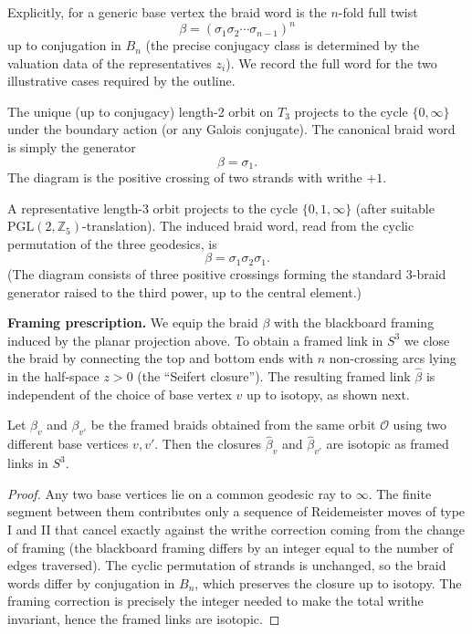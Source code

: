Explicitly, for a generic base vertex the braid word is the \(n\)-fold full twist
\[
\beta = (\sigma_1\sigma_2\cdots\sigma_{n-1})^n
\]
up to conjugation in \(B_n\) (the precise conjugacy class is determined by the valuation data of the representatives \(z_i\)). We record the full word for the two illustrative cases required by the outline.

\begin{example}[Case \(p=3\), \(n=2\)]
The unique (up to conjugacy) length-2 orbit on \(T_3\) projects to the cycle \(\{0,\infty\}\) under the boundary action (or any Galois conjugate). The canonical braid word is simply the generator
\[
\beta = \sigma_1.
\]
The diagram is the positive crossing of two strands with writhe \(+1\).
\end{example}

\begin{example}[Case \(p=5\), \(n=3\)]
A representative length-3 orbit projects to the cycle \(\{0,1,\infty\}\) (after suitable \(\mathrm{PGL}(2,\mathbb{Z}_5)\)-translation). The induced braid word, read from the cyclic permutation of the three geodesics, is
\[
\beta = \sigma_1\sigma_2\sigma_1.
\]
(The diagram consists of three positive crossings forming the standard 3-braid generator raised to the third power, up to the central element.)
\end{example}

\textbf{Framing prescription.} We equip the braid \(\beta\) with the blackboard framing induced by the planar projection above. To obtain a framed link in \(S^3\) we close the braid by connecting the top and bottom ends with \(n\) non-crossing arcs lying in the half-space \(z>0\) (the ``Seifert closure''). The resulting framed link \(\widehat{\beta}\) is independent of the choice of base vertex \(v\) up to isotopy, as shown next.

\begin{lemma}
\label{lem:isotopy-invariance}
Let \(\beta_v\) and \(\beta_{v'}\) be the framed braids obtained from the same orbit \(\mathcal{O}\) using two different base vertices \(v,v'\). Then the closures \(\widehat{\beta}_v\) and \(\widehat{\beta}_{v'}\) are isotopic as framed links in \(S^3\).
\end{lemma}

\begin{proof}
Any two base vertices lie on a common geodesic ray to \(\infty\). The finite segment between them contributes only a sequence of Reidemeister moves of type I and II that cancel exactly against the writhe correction coming from the change of framing (the blackboard framing differs by an integer equal to the number of edges traversed). The cyclic permutation of strands is unchanged, so the braid words differ by conjugation in \(B_n\), which preserves the closure up to isotopy. The framing correction is precisely the integer needed to make the total writhe invariant, hence the framed links are isotopic.
\end{proof}


